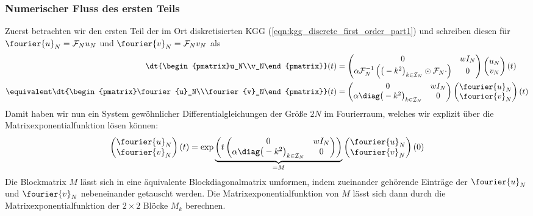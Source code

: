 \subsubsection*{Numerischer Fluss des ersten Teils}
Zuerst betrachten wir den ersten Teil der im Ort diskretisierten KGG (\ref{eqn:kgg_discrete_first_order_part1}) und schreiben diesen für $\fourier{u}_N=\mathcal{F}_Nu_N$ und $\fourier{v}_N=\mathcal{F}_Nv_N$ als
\begin{align*}
\dt{\begin{pmatrix}u_N\\v_N\end{pmatrix}}(t)&=
\begin{pmatrix}0 & wI_N\\ \alpha\mathcal{F}_N^{-1}\left(\big(-k^2\big)_{k\in\mathcal{I}_N}\odot\mathcal{F}_N \cdot\right) & 0\end{pmatrix}
\begin{pmatrix}u_N\\v_N\end{pmatrix}(t)\\
\equivalent 
\dt{\begin{pmatrix}\fourier{u}_N\\\fourier{v}_N\end{pmatrix}}(t)&=
\begin{pmatrix}0 & wI_N\\ \alpha\diag\big(-k^2\big)_{k\in\mathcal{I}_N} & 0\end{pmatrix}
\begin{pmatrix}\fourier{u}_N\\\fourier{v}_N\end{pmatrix}(t)
\end{align*}
Damit haben wir nun ein System gewöhnlicher Differentialgleichungen der Größe $2N$ im Fourierraum, welches wir explizit über die Matrixexponentialfunktion lösen können:
\[\begin{pmatrix}\fourier{u}_N\\\fourier{v}_N\end{pmatrix}(t)=\exp\underbrace{\left(t\begin{pmatrix}0 & wI_N\\ \alpha\diag\big(-k^2\big)_{k\in\mathcal{I}_N} & 0\end{pmatrix}\right)}_{=M}
\begin{pmatrix}\fourier{u}_N\\\fourier{v}_N\end{pmatrix}(0)\]
Die Blockmatrix $M$ lässt sich in eine äquivalente Blockdiagonalmatrix umformen, indem zueinander gehörende Einträge der $\fourier{u}_N$ und $\fourier{v}_N$ nebeneinander getauscht werden. Die Matrixexponentialfunktion von $M$ lässt sich dann durch die Matrixexponentialfunktion der $2\times 2$ Blöcke $M_k$ berechnen. 
